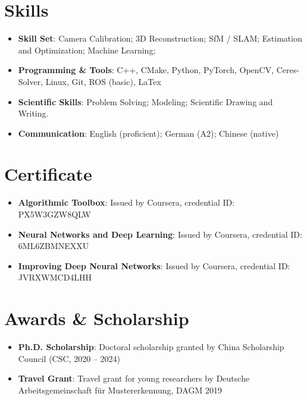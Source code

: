 \documentclass[letterpaper,11pt]{article}
\newcommand{\resumeItem}[2]{
  \item\small{
    \textbf{#1}{: #2 \vspace{-2pt}}
  }
}
\newcommand{\resumeSubItem}[2]{\resumeItem{#1}{#2}\vspace{-4pt}}
\newcommand{\resumeSubHeadingListStart}{\begin{itemize}[leftmargin=*]}
\newcommand{\resumeSubHeadingListEnd}{\end{itemize}}
\begin{document}
\section{Skills}
  \resumeSubHeadingListStart
  	\resumeItem{Skill Set}{Camera Calibration; 3D Reconstruction; SfM / SLAM; Estimation and Optimization; Machine Learning;}
    \resumeSubItem{Programming \& Tools}
      {C++, CMake, Python, PyTorch, OpenCV, Ceres-Solver, Linux, Git, ROS (basic), LaTex}
    \resumeSubItem{Scientific Skills}
      {Problem Solving; Modeling; Scientific Drawing and Writing.}
    \resumeSubItem{Communication}
      {English (proficient); German (A2); Chinese (native)}
  \resumeSubHeadingListEnd

\section{Certificate}
\resumeSubHeadingListStart
\resumeItem{Algorithmic Toolbox}{Issued by Coursera, credential ID: PX5W3GZW8QLW}
\resumeItem{Neural Networks and Deep Learning}{Issued by Coursera, credential ID: 6ML6ZBMNEXXU}
\resumeItem{Improving Deep Neural Networks}{Issued by Coursera, credential ID: JVRXWMCD4LHH}
\resumeSubHeadingListEnd

\section{Awards  \& Scholarship}
\resumeSubHeadingListStart
\resumeItem{Ph.D. Scholarship}{Doctoral scholarship granted by China Scholarship Council (CSC, 2020 -- 2024)}
\resumeItem{Travel Grant}{Travel grant for young researchers by Deutsche Arbeitsgemeinschaft f\"ur Mustererkennung, DAGM 2019}
\resumeSubHeadingListEnd

  
\end{document}
